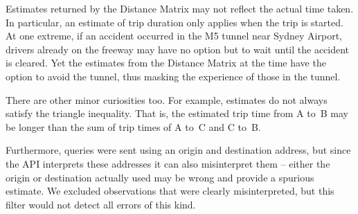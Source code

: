 \documentclass{grattan}
\begin{document}
Estimates returned by the Distance Matrix may not reflect the actual time taken.
In particular, an estimate of trip duration only applies when the trip is started.
At one extreme, if an accident occurred in the M5 tunnel near Sydney Airport, drivers already on the freeway may have no option but to wait until the accident is cleared.
Yet the estimates from the Distance Matrix at the time have the option to avoid the tunnel, thus masking the experience of those in the tunnel.

There are other minor curiosities too.
For example, estimates do not always satisfy the triangle inequality.
That is, the estimated trip time from A to~B may be longer than the sum of trip times of A to~C and C to~B.

Furthermore, queries were sent using an origin and destination address, but since the API interprets these addresses it can also misinterpret them -- either the origin or destination actually used may be wrong and provide a spurious estimate.
We excluded observations that were clearly misinterpreted, but this filter would not detect all errors of this kind.
\end{document}
